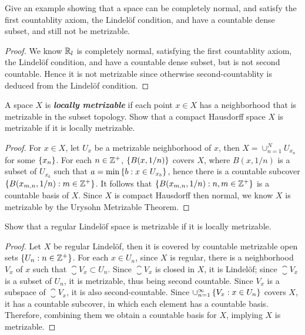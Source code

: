 \documentclass[12pt,a4paper]{article}
\begin{document}
    \begin{ex}
        Give an example showing that a space can be completely normal, and satisfy the first countablity axiom, the Lindel\"of condition, and have a countable dense subset, and still not be metrizable.
    \end{ex}
    \begin{proof}
        We know $\mathbb{R}_l$ is completely normal, satisfying the first countablity axiom, the Lindel\"of condition, and have a countable dense subset, but is not second countable. Hence it is not metrizable since otherwise second-countablity is deduced from the Lindel\"of condition.
    \end{proof}
    \hfill

    \begin{ex}
        A space $X$ is \textbf{\textit{locally metrizable}} if each point $x\in X$ has a neighborhood that is metrizable in the subset topology. Show that a compact Hausdorff space $X$ is metrizable if it is locally metrizable.
    \end{ex}
    \begin{proof}
        For $x\in X$, let $U_x$ be a metrizable neighborhood of $x$, then $X=\cup_{n=1}^N U_{x_n}$ for some $\left\{x_n\right\}$. For each $n\in\mathbb{Z}^+$, $\left\{B(x,1/n)\right\}$ covers $X$, where $B(x,1/n)$ is a subset of $U_{x_a}$ such that $a=\min\left\{b:x\in U_{x_b}\right\}$, hence there is a countable subcover $\left\{B(x_{m,n},1/n):m\in\mathbb{Z}^+\right\}$. It follows that $\left\{B(x_{m,n},1/n):n,m\in\mathbb{Z}^+\right\}$ is a countable basis of $X$. Since $X$ is compact Hausdorff then normal, we know $X$ is metrizable by the Urysohn Metrizable Theorem.
    \end{proof}
    \hfill

    \begin{ex}
        Show that a regular Lindel\"of space is metrizable if it is locally metrizable.
    \end{ex}
    \begin{proof}
        Let $X$ be regular Lindel\"of, then it is covered by countable metrizable open sets $\left\{U_n:n\in\mathbb{Z}^+\right\}$. For each $x\in U_n$, since $X$ is regular, there is a neighborhood $V_x$ of $x$ such that $\closure{V_x}\subset U_n$. Since $\closure{V_x}$ is closed in $X$, it is Lindel\"of; since $\closure{V_x}$ is a subset of $U_n$, it is metrizable, thus being second countable. Since $V_x$ is a subspace of $\closure{V_x}$, it is also second-countable. Since $\cup_{n=1}^\infty\left\{V_x:x\in U_n\right\}$ covers $X$, it has a countable subcover, in which each element has a countable basis. Therefore, combining them we obtain a countable basis for $X$, implying $X$ is metrizable. 
    \end{proof}
    \hfill
\end{document}
